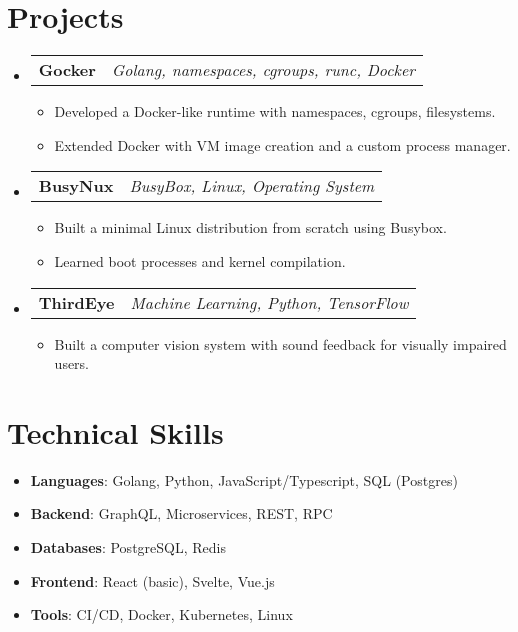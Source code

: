 \documentclass[a4paper,11pt]{article}
\makeatletter
\newcommand{\resumeProject}[2]{
  \item
    \begin{tabular*}{0.97\textwidth}{l@{\extracolsep{\fill}}r}
      \textbf{#1} & \emph{#2} \\
    \end{tabular*}\vspace{-5pt}
}
\newcommand{\resumeItem}[1]{\item \small{#1}}
\newcommand{\resumeListStart}{\begin{itemize}[leftmargin=0.15in,label=\textbullet]}
\newcommand{\resumeListEnd}{\end{itemize}\vspace{-5pt}}
\makeatother
\begin{document}
\section{Projects}
\resumeListStart

  \resumeProject{Gocker}{Golang, namespaces, cgroups, runc, Docker}
  \resumeListStart
    \resumeItem{Developed a Docker-like runtime with namespaces, cgroups, filesystems.}
    \resumeItem{Extended Docker with VM image creation and a custom process manager.}
  \resumeListEnd

  \resumeProject{BusyNux}{BusyBox, Linux, Operating System}
  \resumeListStart
    \resumeItem{Built a minimal Linux distribution from scratch using Busybox.}
    \resumeItem{Learned boot processes and kernel compilation.}
  \resumeListEnd

  \resumeProject{ThirdEye}{Machine Learning, Python, TensorFlow}
  \resumeListStart
    \resumeItem{Built a computer vision system with sound feedback for visually impaired users.}
  \resumeListEnd

\resumeListEnd

\section{Technical Skills}
\resumeListStart
    \resumeItem {\textbf{Languages}{: Golang, Python, JavaScript/Typescript, SQL (Postgres)}} \\
    \resumeItem {\textbf{Backend}{: GraphQL, Microservices, REST, RPC}} \\
    \resumeItem {\textbf{Databases}{: PostgreSQL, Redis} }\\
    \resumeItem {\textbf{Frontend}{: React (basic), Svelte, Vue.js} }\\
    \resumeItem {\textbf{Tools}{: CI/CD, Docker, Kubernetes, Linux}}

\resumeListEnd
\end{document}

